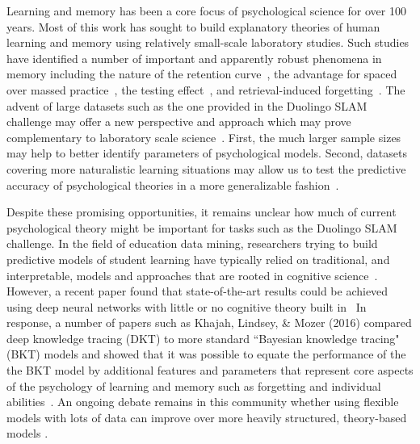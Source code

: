 \documentclass[11pt,a4paper]{article}
\begin{document}
Learning and memory has been a core focus of psychological science for
over 100 years. Most of this work has sought to build explanatory theories of human learning
and memory using relatively small-scale laboratory studies.  Such studies have
identified a number of important and apparently robust phenomena in memory including
the nature of the retention curve~\cite{Rubin:1996aa}, the advantage for spaced over massed 
practice~\cite{Ruth:1928aa,Cepeda:2006aa,Mozer:2009cs}, the testing effect~\cite{Roediger2006te},
and retrieval-induced forgetting~\cite{Anderson1994rif}.
The advent of large datasets such as the one provided in the Duolingo SLAM challenge
may offer a new perspective and approach which may prove complementary
to laboratory scale science~\cite{Griffiths:2015aa,Goldstone:2016aa}.  First, the much
larger sample sizes may help to better identify parameters of psychological models.
Second, datasets covering more naturalistic learning situations may allow us to test 
the predictive accuracy of psychological theories in a more generalizable fashion~\cite{Yarkoni:2017aa}.

Despite these promising opportunities, it remains unclear how much of current psychological
theory might be important for tasks such as the Duolingo SLAM challenge.
In the field of education data mining, researchers trying to build
predictive models of student learning have typically relied on traditional, and interpretable, models and approaches
that are rooted in cognitive science~\cite[e.g.,][]{Atkinson:1972rm,Atkinson:1972rz,Corbett1995bkt,Pavlik:2008rm}.
However, a recent paper found that state-of-the-art results could be achieved using deep neural networks with
little or no cognitive theory built in~\cite[so called ``deep knowledge tracing",][]{Piech:2015aa} 
In response, a number of papers such as Khajah, Lindsey, \& Mozer (2016) compared deep knowledge tracing (DKT) to more
standard ``Bayesian knowledge tracing" (BKT) models and showed
that it was possible to equate the performance of the the BKT model by additional 
features and parameters that represent core aspects of the psychology of learning
and memory such as forgetting and individual abilities~\cite{Khajah2016hdnt}. An ongoing debate remains in this community 
whether using flexible models with lots of data can improve over more heavily structured, theory-based models \cite{Tang:2016:DNN, xiong2016going, zhang2017incorporating}.
\end{document}
